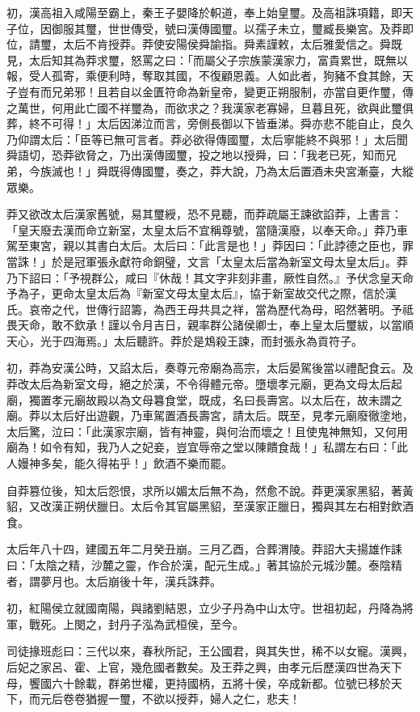 \begin{pinyinscope}
初，漢高祖入咸陽至霸上，秦王子嬰降於軹道，奉上始皇璽。及高祖誅項籍，即天子位，因御服其璽，世世傳受，號曰漢傳國璽。以孺子未立，璽臧長樂宮。及莽即位，請璽，太后不肯授莽。莽使安陽侯舜諭指。舜素謹敕，太后雅愛信之。舜既見，太后知其為莽求璽，怒罵之曰：「而屬父子宗族蒙漢家力，富貴累世，既無以報，受人孤寄，乘便利時，奪取其國，不復顧恩義。人如此者，狗豬不食其餘，天子豈有而兄弟邪！且若自以金匱符命為新皇帝，變更正朔服制，亦當自更作璽，傳之萬世，何用此亡國不祥璽為，而欲求之？我漢家老寡婦，旦暮且死，欲與此璽俱葬，終不可得！」太后因涕泣而言，旁側長御以下皆垂涕。舜亦悲不能自止，良久乃仰謂太后：「臣等已無可言者。莽必欲得傳國璽，太后寧能終不與邪！」太后聞舜語切，恐莽欲脅之，乃出漢傳國璽，投之地以授舜，曰：「我老已死，知而兄弟，今族滅也！」舜既得傳國璽，奏之，莽大說，乃為太后置酒未央宮漸臺，大縱眾樂。

莽又欲改太后漢家舊號，易其璽綬，恐不見聽，而莽疏屬王諫欲諂莽，上書言：「皇天廢去漢而命立新室，太皇太后不宜稱尊號，當隨漢廢，以奉天命。」莽乃車駕至東宮，親以其書白太后。太后曰：「此言是也！」莽因曰：「此誖德之臣也，罪當誅！」於是冠軍張永獻符命銅璧，文言「太皇太后當為新室文母太皇太后」。莽乃下詔曰：「予視群公，咸曰『休哉！其文字非刻非畫，厥性自然。』予伏念皇天命予為子，更命太皇太后為『新室文母太皇太后』，協于新室故交代之際，信於漢氏。哀帝之代，世傳行詔籌，為西王母共具之祥，當為歷代為母，昭然著明。予祗畏天命，敢不欽承！謹以令月吉日，親率群公諸侯卿士，奉上皇太后璽紱，以當順天心，光于四海焉。」太后聽許。莽於是鴆殺王諫，而封張永為貢符子。

初，莽為安漢公時，又諂太后，奏尊元帝廟為高宗，太后晏駕後當以禮配食云。及莽改太后為新室文母，絕之於漢，不令得體元帝。墮壞孝元廟，更為文母太后起廟，獨置孝元廟故殿以為文母篹食堂，既成，名曰長壽宮。以太后在，故未謂之廟。莽以太后好出遊觀，乃車駕置酒長壽宮，請太后。既至，見孝元廟廢徹塗地，太后驚，泣曰：「此漢家宗廟，皆有神靈，與何治而壞之！且使鬼神無知，又何用廟為！如令有知，我乃人之妃妾，豈宜辱帝之堂以陳饋食哉！」私謂左右曰：「此人嫚神多矣，能久得祐乎！」飲酒不樂而罷。

自莽篡位後，知太后怨恨，求所以媚太后無不為，然愈不說。莽更漢家黑貂，著黃貂，又改漢正朔伏臘日。太后令其官屬黑貂，至漢家正臘日，獨與其左右相對飲酒食。

太后年八十四，建國五年二月癸丑崩。三月乙酉，合葬渭陵。莽詔大夫揚雄作誄曰：「太陰之精，沙麓之靈，作合於漢，配元生成。」著其協於元城沙麓。泰陰精者，謂夢月也。太后崩後十年，漢兵誅莽。

初，紅陽侯立就國南陽，與諸劉結恩，立少子丹為中山太守。世祖初起，丹降為將軍，戰死。上閔之，封丹子泓為武桓侯，至今。

司徒掾班彪曰：三代以來，春秋所記，王公國君，與其失世，稀不以女寵。漢興，后妃之家呂、霍、上官，幾危國者數矣。及王莽之興，由孝元后歷漢四世為天下母，饗國六十餘載，群弟世權，更持國柄，五將十侯，卒成新都。位號已移於天下，而元后卷卷猶握一璽，不欲以授莽，婦人之仁，悲夫！


\end{pinyinscope}